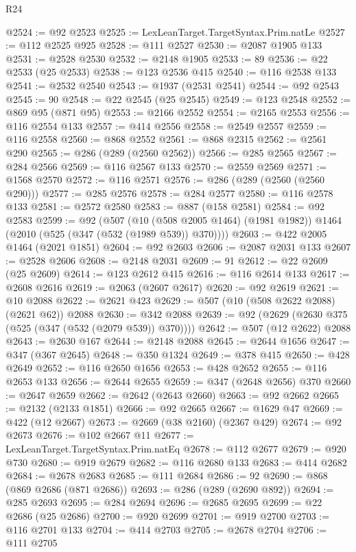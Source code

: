 \begin{lexlean}{R24}
\begin{coremodule}
{{{{{{{{{{{{{{{{{{{{{{{{{{{{{{{{{{{{{{{{{{{{{{{{{{{{{{{{{{{{{{{{{{{{{{{{{{{{{{{{{{{{{{{{{{{{{{{{{{{{{{{{{{{{{{{{{{{{{{{{{{{{{{{{{{{{{{{{{{{{{{{{{{{{{{{{{{{{{{{{{{{{{{{{{{{{{{{{{{{{{{{{{{{{{{{{{{{@2524 := @92 @2523
@2525 := LexLeanTarget.TargetSyntax.Prim.natLe
@2527 := @112 @2525 @925
@2528 := @111 @2527
@2530 := @2087 @1905 @133
@2531 := @2528 @2530
@2532 := @2148 @1905
@2533 := 89
@2536 := @22 @2533 (@25 @2533)
@2538 := @123 @2536 @415
@2540 := @116 @2538 @133
@2541 := @2532 @2540
@2543 := @1937 (@2531 @2541)
@2544 := @92 @2543
@2545 := 90
@2548 := @22 @2545 (@25 @2545)
@2549 := @123 @2548
@2552 := @869 @95 (@871 @95)
@2553 := @2166 @2552
@2554 := @2165 @2553
@2556 := @116 @2554 @133
@2557 := @414 @2556
@2558 := @2549 @2557
@2559 := @116 @2558
@2560 := @868 @2552
@2561 := @868 @2315
@2562 := @2561 @290
@2565 := @286 (@289 (@2560 @2562))
@2566 := @285 @2565
@2567 := @284 @2566
@2569 := @116 @2567 @133
@2570 := @2559 @2569
@2571 := @1568 @2570
@2572 := @116 @2571
@2576 := @286 (@289 (@2560 (@2560 @290)))
@2577 := @285 @2576
@2578 := @284 @2577
@2580 := @116 @2578 @133
@2581 := @2572 @2580
@2583 := @887 (@158 @2581)
@2584 := @92 @2583
@2599 := @92
    (@507
      (@10 (@508 @2005 @1464) (@1981 @1982))
      @1464
      (@2010 (@525 (@347 (@532 (@1989 @539)) @370))))
@2603 := @422 @2005 @1464 (@2021 @1851)
@2604 := @92 @2603
@2606 := @2087 @2031 @133
@2607 := @2528 @2606
@2608 := @2148 @2031
@2609 := 91
@2612 := @22 @2609 (@25 @2609)
@2614 := @123 @2612 @415
@2616 := @116 @2614 @133
@2617 := @2608 @2616
@2619 := @2063 (@2607 @2617)
@2620 := @92 @2619
@2621 := @10 @2088
@2622 := @2621 @423
@2629 := @507 (@10 (@508 @2622 @2088) (@2621 @62)) @2088
@2630 := @342 @2088
@2639 := @92 (@2629 (@2630 @375 (@525 (@347 (@532 (@2079 @539)) @370))))
@2642 := @507 (@12 @2622) @2088
@2643 := @2630 @167
@2644 := @2148 @2088
@2645 := @2644 @1656
@2647 := @347 (@367 @2645)
@2648 := @350 @1324
@2649 := @378 @415
@2650 := @428 @2649
@2652 := @116 @2650 @1656
@2653 := @428 @2652
@2655 := @116 @2653 @133
@2656 := @2644 @2655
@2659 := @347 (@2648 @2656) @370
@2660 := @2647 @2659
@2662 := @2642 (@2643 @2660)
@2663 := @92 @2662
@2665 := @2132 (@2133 @1851)
@2666 := @92 @2665
@2667 := @1629 @47
@2669 := @422 (@12 @2667)
@2673 := @2669 (@38 @2160) (@2367 @429)
@2674 := @92 @2673
@2676 := @102 @2667 @11
@2677 := LexLeanTarget.TargetSyntax.Prim.natEq
@2678 := @112 @2677
@2679 := @920 @730
@2680 := @919 @2679
@2682 := @116 @2680 @133
@2683 := @414 @2682
@2684 := @2678 @2683
@2685 := @111 @2684
@2686 := 92
@2690 := @868 (@869 @2686 (@871 @2686))
@2693 := @286 (@289 (@2690 @892))
@2694 := @285 @2693
@2695 := @284 @2694
@2696 := @2685 @2695
@2699 := @22 @2686 (@25 @2686)
@2700 := @920 @2699
@2701 := @919 @2700
@2703 := @116 @2701 @133
@2704 := @414 @2703
@2705 := @2678 @2704
@2706 := @111 @2705
}}}}}}}}}}}}}}}}}}}}}}}}}}}}}}}}}}}}}}}}}}}}}}}}}}}}}}}}}}}}}}}}}}}}}}}}}}}}}}}}}}}}}}}}}}}}}}}}}}}}}}}}}}}}}}}}}}}}}}}}}}}}}}}}}}}}}}}}}}}}}}}}}}}}}}}}}}}}}}}}}}}}}}}}}}}}}}}}}}}}}}}}}}}}}}}}}}}
\end{coremodule}
\end{lexlean}
